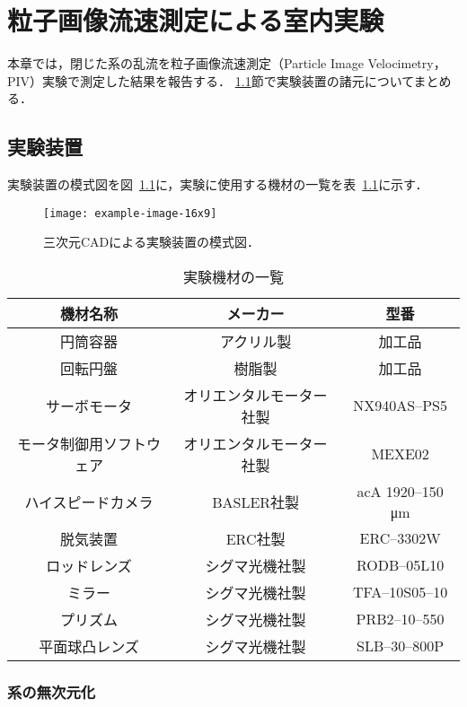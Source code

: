\chapter{粒子画像流速測定による室内実験}
\label{chap:Experiment}

本章では，閉じた系の乱流を粒子画像流速測定（Particle Image Velocimetry，PIV）実験で測定した結果を報告する．
\ref{sec:ExperimentalSetup}節で実験装置の諸元についてまとめる．


\section{実験装置}
\label{sec:ExperimentalSetup}

実験装置の模式図を図~\ref{fig:experiment_schematic}に，実験に使用する機材の一覧を表~\ref{table:ListofEquipment}に示す．
\begin{figure}[!t]
  \centering
  \texttt{[image: example-image-16x9]}
  \caption{
    三次元CADによる実験装置の模式図．
  }
  \label{fig:experiment_schematic}
\end{figure}

\begin{table}[!t]
  \centering
  \caption{実験機材の一覧}
  \begin{tabular}{c|cc}
    機材名称 & メーカー & 型番 \\ \hline \hline
    円筒容器 & アクリル製 & 加工品 \\
    回転円盤 & 樹脂製 & 加工品 \\
    サーボモータ & オリエンタルモーター社製 & NX940AS--PS5 \\
    モータ制御用ソフトウェア & オリエンタルモーター社製 & MEXE02 \\
    ハイスピードカメラ & BASLER社製 & acA 1920--150 \si{\micro \meter} \\
    脱気装置 & ERC社製 & ERC--3302W \\
    ロッドレンズ & シグマ光機社製 & RODB--05L10 \\
    ミラー & シグマ光機社製 & TFA--10S05--10 \\
    プリズム & シグマ光機社製 & PRB2--10--550 \\
    平面球凸レンズ & シグマ光機社製 & SLB--30--800P
  \end{tabular}
  \label{table:ListofEquipment}
\end{table}


\subsection{系の無次元化}
\label{subsec:ES_UndimentionalizedSystem}

